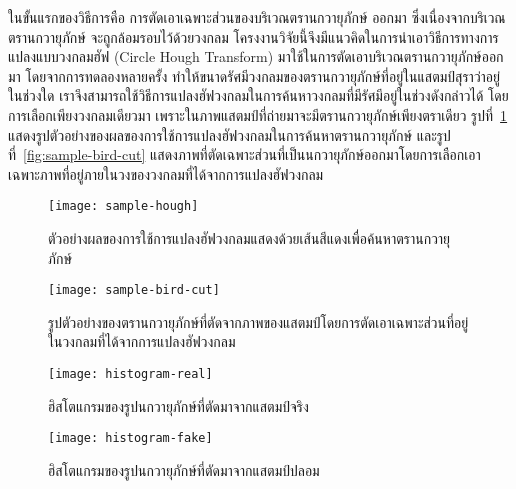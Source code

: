 ในขั้นแรกของวิธีการคือ การตัดเอาเฉพาะส่วนของบริเวณตรานกวายุภักษ์ ออกมา ซึ่งเนื่องจากบริเวณตรานกวายุภักษ์ จะถูกล้อมรอบไว้ด้วยวงกลม โครงงานวิจัยนี้จึงมีแนวคิดในการนำเอาวิธีการทางการแปลงแบบวงกลมฮัฟ (Circle Hough Transform)  มาใช้ในการตัดเอาบริเวณตรานกวายุภักษ์ออกมา โดยจากการทดลองหลายครั้ง ทำให้ขนาดรัศมีวงกลมของตรานกวายุภักษ์ที่อยู่ในแสตมป์สุราว่าอยู่ในช่วงใด  เราจึงสามารถใช้วิธีการแปลงฮัฟวงกลมในการค้นหาวงกลมที่มีรัศมีอยู่ในช่วงดังกล่าวได้ โดยการเลือกเพียงวงกลมเดียวมา เพราะในภาพแสตมป์ที่ถ่ายมาจะมีตรานกวายุภักษ์เพียงตราเดียว รูปที่~\ref{fig:sample-hough} แสดงรูปตัวอย่างของผลของการใช้การแปลงฮัฟวงกลมในการค้นหาตรานกวายุภักษ์  และรูปที่~\ref{fig:sample-bird-cut} แสดงภาพที่ตัดเฉพาะส่วนที่เป็นนกวายุภักษ์ออกมาโดยการเลือกเอาเฉพาะภาพที่อยู่ภายในวงของวงกลมที่ได้จากการแปลงฮัฟวงกลม


\begin{figure}[!ht]
\centering
\texttt{[image: sample-hough]}
\vspace{2em}
\caption{ตัวอย่างผลของการใช้การแปลงฮัฟวงกลมแสดงด้วยเส้นสีแดงเพื่อค้นหาตรานกวายุภักษ์}
\label{fig:sample-hough}
\end{figure}

\begin{figure}[!ht]
\centering
\texttt{[image: sample-bird-cut]}
\vspace{2em}
\caption{รูปตัวอย่างของตรานกวายุภักษ์ที่ตัดจากภาพของแสตมป์โดยการตัดเอาเฉพาะส่วนที่อยู่ในวงกลมที่ได้จากการแปลงฮัฟวงกลม}
\label{fig:bird-cut}
\end{figure}



\begin{figure}[!]
\centering
\texttt{[image: histogram-real]}
\vspace{2em}
\caption{ฮิสโตแกรมของรูปนกวายุภักษ์ที่ตัดมาจากแสตมป์จริง}
\label{fig:histogram-real}
\end{figure}
\begin{figure}[!]
\centering
\texttt{[image: histogram-fake]}
\vspace{2em}
\caption{ฮิสโตแกรมของรูปนกวายุภักษ์ที่ตัดมาจากแสตมป์ปลอม}
\label{fig:histogram-fake}
\end{figure}

